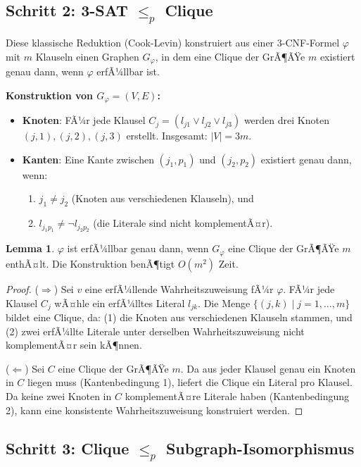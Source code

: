 ﻿\documentclass[a4paper,12pt]{article}
\theoremstyle{definition}
\newtheorem{lemma}{Lemma}
\begin{document}
\subsection{Schritt 2: 3-SAT $\leq_p$ Clique}

Diese klassische Reduktion (Cook-Levin) konstruiert aus einer 3-CNF-Formel $\varphi$ mit $m$ Klauseln einen Graphen $G_\varphi$, in dem eine Clique der GrÃ¶ÃŸe $m$ existiert genau dann, wenn $\varphi$ erfÃ¼llbar ist.

\textbf{Konstruktion von $G_\varphi = (V, E)$:}
\begin{itemize}
    \item[-] \textbf{Knoten}: FÃ¼r jede Klausel $C_j = (l_{j1} \lor l_{j2} \lor l_{j3})$ werden drei Knoten $(j, 1), (j, 2), (j, 3)$ erstellt. Insgesamt: $|V| = 3m$.
    \item[-] \textbf{Kanten}: Eine Kante zwischen $(j_1, p_1)$ und $(j_2, p_2)$ existiert genau dann, wenn:
    \begin{enumerate}
        \item $j_1 \neq j_2$ (Knoten aus verschiedenen Klauseln), und
        \item $l_{j_1 p_1} \neq \neg l_{j_2 p_2}$ (die Literale sind nicht komplementÃ¤r).
    \end{enumerate}
\end{itemize}

\begin{lemma}
    $\varphi$ ist erfÃ¼llbar genau dann, wenn $G_\varphi$ eine Clique der GrÃ¶ÃŸe $m$ enthÃ¤lt. Die Konstruktion benÃ¶tigt $O(m^2)$ Zeit.
\end{lemma}

\begin{proof}
    ($\Rightarrow$) Sei $v$ eine erfÃ¼llende Wahrheitszuweisung fÃ¼r $\varphi$. FÃ¼r jede Klausel $C_j$ wÃ¤hle ein erfÃ¼lltes Literal $l_{jk}$. Die Menge $\{(j, k) \mid j = 1, \ldots, m\}$ bildet eine Clique, da: (1) die Knoten aus verschiedenen Klauseln stammen, und (2) zwei erfÃ¼llte Literale unter derselben Wahrheitszuweisung nicht komplementÃ¤r sein kÃ¶nnen.
    
    ($\Leftarrow$) Sei $C$ eine Clique der GrÃ¶ÃŸe $m$. Da aus jeder Klausel genau ein Knoten in $C$ liegen muss (Kantenbedingung 1), liefert die Clique ein Literal pro Klausel. Da keine zwei Knoten in $C$ komplementÃ¤re Literale haben (Kantenbedingung 2), kann eine konsistente Wahrheitszuweisung konstruiert werden.
\end{proof}

\subsection{Schritt 3: Clique $\leq_p$ Subgraph-Isomorphismus}
\end{document}
